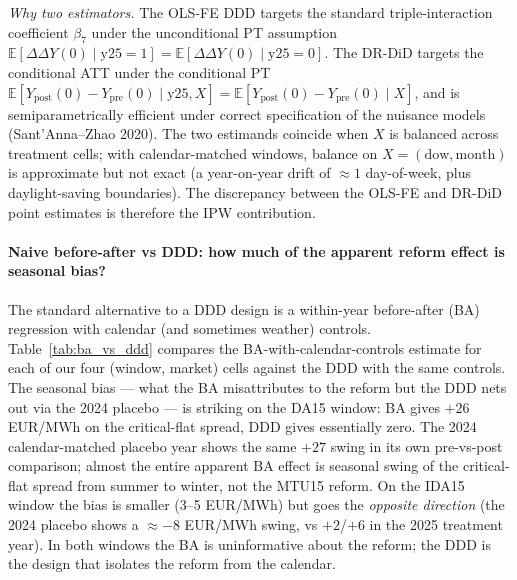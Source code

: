 \documentclass[11pt,a4paper]{article}
\begin{document}
\textit{Why two estimators.} The OLS-FE DDD targets the standard triple-interaction coefficient $\beta_7$ under the unconditional PT assumption $\mathbb{E}[\Delta\Delta Y(0) \mid \text{y25}=1] = \mathbb{E}[\Delta\Delta Y(0) \mid \text{y25}=0]$. The DR-DiD targets the conditional ATT under the conditional PT $\mathbb{E}[Y_{\text{post}}(0) - Y_{\text{pre}}(0) \mid \text{y25}, X] = \mathbb{E}[Y_{\text{post}}(0) - Y_{\text{pre}}(0) \mid X]$, and is semiparametrically efficient under correct specification of the nuisance models (Sant'Anna--Zhao 2020). The two estimands coincide when $X$ is balanced across treatment cells; with calendar-matched windows, balance on $X = (\text{dow}, \text{month})$ is approximate but not exact (a year-on-year drift of $\approx 1$ day-of-week, plus daylight-saving boundaries). The discrepancy between the OLS-FE and DR-DiD point estimates is therefore the IPW contribution.

\paragraph{Naive before-after vs DDD: how much of the apparent reform effect is seasonal bias?}
The standard alternative to a DDD design is a within-year before-after (BA) regression with calendar (and sometimes weather) controls. Table~\ref{tab:ba_vs_ddd} compares the BA-with-calendar-controls estimate for each of our four (window, market) cells against the DDD with the same controls. The seasonal bias --- what the BA misattributes to the reform but the DDD nets out via the 2024 placebo --- is striking on the DA15 window: BA gives $+26$ EUR/MWh on the critical-flat spread, DDD gives essentially zero. The 2024 calendar-matched placebo year shows the same $+27$ swing in its own pre-vs-post comparison; almost the entire apparent BA effect is seasonal swing of the critical-flat spread from summer to winter, not the MTU15 reform. On the IDA15 window the bias is smaller (3--5 EUR/MWh) but goes the \emph{opposite direction} (the 2024 placebo shows a $\approx-8$ EUR/MWh swing, vs $+2$/$+6$ in the 2025 treatment year). In both windows the BA is uninformative about the reform; the DDD is the design that isolates the reform from the calendar.


\end{document}
